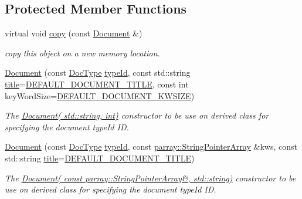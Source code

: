 \subsection*{Protected Member Functions}
\begin{DoxyCompactItemize}
\item 
\hypertarget{classdocs_1_1Document_ad8b6a91c7a8e39a880790d14aba14322}{virtual void \hyperlink{classdocs_1_1Document_ad8b6a91c7a8e39a880790d14aba14322}{copy} (const \hyperlink{classdocs_1_1Document}{Document} \&)}\label{classdocs_1_1Document_ad8b6a91c7a8e39a880790d14aba14322}

\begin{DoxyCompactList}\small\item\em copy this object on a new memory location. \end{DoxyCompactList}\item 
\hypertarget{classdocs_1_1Document_a9f0b2c4c1a3e3344f374330399969e90}{\hyperlink{classdocs_1_1Document_a9f0b2c4c1a3e3344f374330399969e90}{Document} (const \hyperlink{classdocs_1_1DocType}{Doc\-Type} \hyperlink{classdocs_1_1Document_ad5250ef4bd98928dfbe6243162536389}{type\-Id}, const std\-::string \hyperlink{classdocs_1_1Document_a419e4470c20e1bddd60448ba430f4738}{title}=\hyperlink{namespacedocs_a4cf6dd6732c7e7ab7f7855e440485d89}{D\-E\-F\-A\-U\-L\-T\-\_\-\-D\-O\-C\-U\-M\-E\-N\-T\-\_\-\-T\-I\-T\-L\-E}, const int key\-Word\-Size=\hyperlink{namespacedocs_ae635b9481a61628036b5a97625856475}{D\-E\-F\-A\-U\-L\-T\-\_\-\-D\-O\-C\-U\-M\-E\-N\-T\-\_\-\-K\-W\-S\-I\-Z\-E})}\label{classdocs_1_1Document_a9f0b2c4c1a3e3344f374330399969e90}

\begin{DoxyCompactList}\small\item\em The \hyperlink{classdocs_1_1Document_ace8d18f691181e1676a6ca5207da336b}{Document( std\-::string, int)} constructor to be use on derived class for specifying the document type\-Id I\-D. \end{DoxyCompactList}\item 
\hypertarget{classdocs_1_1Document_a4a76d0cee2709582e4b9f3b5b8db0277}{\hyperlink{classdocs_1_1Document_a4a76d0cee2709582e4b9f3b5b8db0277}{Document} (const \hyperlink{classdocs_1_1DocType}{Doc\-Type} \hyperlink{classdocs_1_1Document_ad5250ef4bd98928dfbe6243162536389}{type\-Id}, const \hyperlink{classparray_1_1StringPointerArray}{parray\-::\-String\-Pointer\-Array} \&kws, const std\-::string \hyperlink{classdocs_1_1Document_a419e4470c20e1bddd60448ba430f4738}{title}=\hyperlink{namespacedocs_a4cf6dd6732c7e7ab7f7855e440485d89}{D\-E\-F\-A\-U\-L\-T\-\_\-\-D\-O\-C\-U\-M\-E\-N\-T\-\_\-\-T\-I\-T\-L\-E})}\label{classdocs_1_1Document_a4a76d0cee2709582e4b9f3b5b8db0277}

\begin{DoxyCompactList}\small\item\em The \hyperlink{classdocs_1_1Document_aa9c1a4e9b6aab58e8e28b16a2888e601}{Document( const parray\-::\-String\-Pointer\-Array\&, std\-::string)} constructor to be use on derived class for specifying the document type\-Id I\-D. \end{DoxyCompactList}\end{DoxyCompactItemize}

